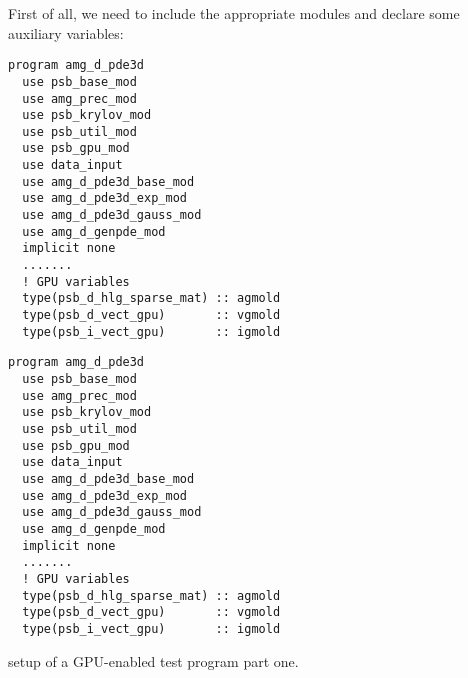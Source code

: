 First of all, we need to include the appropriate modules and
declare some auxiliary variables:
\begin{listing}[h!]
\ifpdf
\begin{verbatim}
program amg_d_pde3d
  use psb_base_mod
  use amg_prec_mod
  use psb_krylov_mod
  use psb_util_mod
  use psb_gpu_mod
  use data_input
  use amg_d_pde3d_base_mod
  use amg_d_pde3d_exp_mod
  use amg_d_pde3d_gauss_mod
  use amg_d_genpde_mod
  implicit none
  .......
  ! GPU variables
  type(psb_d_hlg_sparse_mat) :: agmold
  type(psb_d_vect_gpu)       :: vgmold
  type(psb_i_vect_gpu)       :: igmold
\end{verbatim}
\else
\begin{center}
\begin{minipage}{.90\textwidth}
{\small
\begin{verbatim}
program amg_d_pde3d
  use psb_base_mod
  use amg_prec_mod
  use psb_krylov_mod
  use psb_util_mod
  use psb_gpu_mod
  use data_input
  use amg_d_pde3d_base_mod
  use amg_d_pde3d_exp_mod
  use amg_d_pde3d_gauss_mod
  use amg_d_genpde_mod
  implicit none
  .......
  ! GPU variables
  type(psb_d_hlg_sparse_mat) :: agmold
  type(psb_d_vect_gpu)       :: vgmold
  type(psb_i_vect_gpu)       :: igmold

 \end{verbatim}
}
\end{minipage}
\end{center}
\fi
\caption{setup of a GPU-enabled test program part one.\label{fig:gpu-ex1}}
\end{listing}


